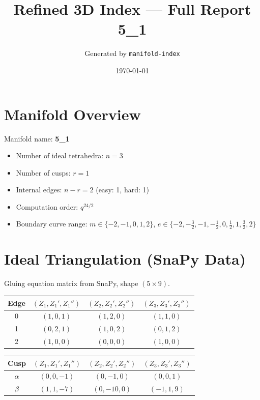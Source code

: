 \documentclass[11pt,a4paper]{article}
\begin{document}
\title{Refined 3D Index — Full Report \\ \large 5\_1}
\author{Generated by \texttt{manifold-index}}
\date{\today}
\maketitle
\tableofcontents
\newpage

\section{Manifold Overview}
Manifold name: \textbf{5\_1}

\begin{itemize}
  \item Number of ideal tetrahedra: $n = 3$
  \item Number of cusps: $r = 1$
  \item Internal edges: $n - r = 2$ (easy: 1, hard: 1)
  \item Computation order: $q^{24/2}$
  \item Boundary curve range: $m \in \{-2, -1, 0, 1, 2\}$, $e \in \{-2, -\tfrac{3}{2}, -1, -\tfrac{1}{2}, 0, \tfrac{1}{2}, 1, \tfrac{3}{2}, 2\}$
\end{itemize}

\section{Ideal Triangulation (SnaPy Data)}
Gluing equation matrix from SnaPy, shape $(5 \times 9)$.

\begin{longtable}{c c c c}
\toprule
Edge & $(Z_{1}, Z_{1}', Z_{1}'')$ & $(Z_{2}, Z_{2}', Z_{2}'')$ & $(Z_{3}, Z_{3}', Z_{3}'')$ \\ \midrule
\endhead
0 & $(1, 0, 1)$ & $(1, 2, 0)$ & $(1, 1, 0)$ \\
1 & $(0, 2, 1)$ & $(1, 0, 2)$ & $(0, 1, 2)$ \\
2 & $(1, 0, 0)$ & $(0, 0, 0)$ & $(1, 0, 0)$ \\
\bottomrule
\end{longtable}

\begin{longtable}{c c c c}
\toprule
Cusp & $(Z_{1}, Z_{1}', Z_{1}'')$ & $(Z_{2}, Z_{2}', Z_{2}'')$ & $(Z_{3}, Z_{3}', Z_{3}'')$ \\ \midrule
\endhead
$\alpha$ & $(0, 0, -1)$ & $(0, -1, 0)$ & $(0, 0, 1)$ \\
$\beta$ & $(1, 1, -7)$ & $(0, -10, 0)$ & $(-1, 1, 9)$ \\
\bottomrule
\end{longtable}
\end{document}
